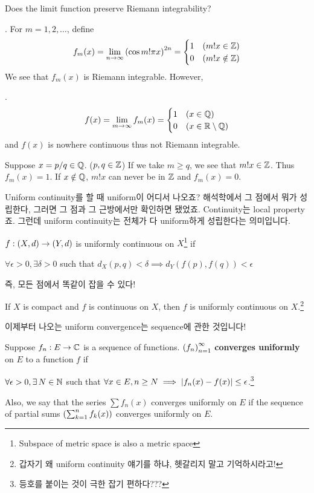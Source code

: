 Does the limit function preserve Riemann integrability?

\ex. For \(m = 1, 2, \dots\), define
\[
    f_m(x) = \lim_{n\rightarrow \infty} \left(\cos m! \pi x\right)^{2n} = \begin{cases}
        1 & (m!x \in \mathbb{Z}) \\
        0 & (m!x \notin \mathbb{Z})
    \end{cases}
\]
We see that \(f_m(x)\) is Riemann integrable. However,

\claim.
\[
    f(x) = \lim_{m\rightarrow \infty} f_m(x) = \begin{cases}
        1 & (x\in \mathbb{Q}) \\
        0 & (x \in \mathbb{R} \setminus \mathbb{Q})
    \end{cases}
\]
and \(f(x)\) is nowhere continuous thus not Riemann integrable.

\pf Suppose \(x = p/q \in \mathbb{Q}\). (\(p, q\in \mathbb{Z}\)) If we take \(m \geq q\), we see that \(m! x \in \mathbb{Z}\). Thus \(f_m(x) = 1\). If \(x \notin \mathbb{Q}\), \(m! x\) can never be in \(\mathbb{Z}\) and \(f_m(x) = 0\).

\medskip

\question Uniform continuity를 할 때 uniform이 어디서 나오죠? 해석학에서 그 점에서 뭐가 성립한다, 그러면 그 점과 그 근방에서만 확인하면 됐었죠. Continuity는 local property죠. 그런데 uniform continuity는 전체가 다 uniform하게 성립한다는 의미입니다.

\recall \(f: (X, d) \rightarrow (Y, d)\) is uniformly continuous on \(X\)\footnote{Subspace of metric space is also a metric space} if
\begin{center}
    \(\forall \epsilon > 0, \exists \delta > 0\) such that \(d_X(p, q) < \delta \implies d_Y(f(p), f(q)) < \epsilon\)
\end{center}
즉, 모든 점에서 똑같이 잡을 수 있다!

\recall {} If \(X\) is compact and \(f\) is continuous on \(X\), then \(f\) is uniformly continuous on \(X\).\footnote{갑자기 왜 uniform continuity 얘기를 하냐, 헷갈리지 말고 기억하시라고!}

이제부터 나오는 uniform convergence는 sequence에 관한 것입니다!

  Suppose \(f_n: E \rightarrow \mathbb{C}\) is a sequence of functions. \(\left( f_n \right)_{n=1}^\infty\) \textbf{converges uniformly} on \(E\) to a function \(f\) if
\begin{center}
    \(\forall \epsilon > 0, \exists N\in\N\) such that \(\forall x \in E, n\geq N \implies \left| f_n(x) - f(x) \right| \leq \epsilon\).\footnote{등호를 붙이는 것이 극한 잡기 편하다???}
\end{center}
Also, we say that the series \(\sum f_n(x)\) converges uniformly on \(E\) if the sequence of partial sums \(\left( \sum_{k=1}^n f_k(x) \right)\) converges uniformly on \(E\).

